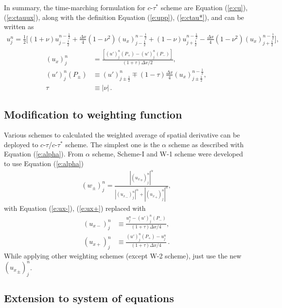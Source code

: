 \documentclass[11pt,dvips]{article}
\numberwithin{equation}{section}
\begin{document}
In summary, the time-marching formulation for $c$-$\tau^*$ scheme are Equation
(\ref{e:cu}), (\ref{e:ctauux}), along with the definition Equation
(\ref{e:upp}), (\ref{e:ctau*}), and can be written as
\begin{align*}
  u_j^n = \frac{1}{2}\Big[
      (1+\nu)u_{j-\frac{1}{2}}^{n-\frac{1}{2}}
    + \frac{\Delta x}{4}(1-\nu^2)(u_x)_{j-\frac{1}{2}}^{n-\frac{1}{2}}
    + (1-\nu)u_{j+\frac{1}{2}}^{n-\frac{1}{2}}
    - \frac{\Delta x}{4}(1-\nu^2)(u_x)_{j+\frac{1}{2}}^{n-\frac{1}{2}}
  \Big],
\end{align*}
\begin{align*}
  (u_x)_j^n &=
    \frac{\left[(u')_j^n(P_+) - (u')_j^n(P_-)\right]}
         {(1+\tau)\Delta x/2}, \\
  (u')_j^n(P_{\pm}) &\equiv
        (u')_{j\pm\frac{1}{2}}^n
    \mp (1-\tau)\frac{\Delta x}{4}
        (u_x)_{j\pm\frac{1}{2}}^{n-\frac{1}{2}}, \\
  \tau &\equiv |\nu|\,.
\end{align*}

\subsection{Modification to weighting function}

Various schemes to calculated the weighted average of spatial derivative can be
deployed to $c$-$\tau$/$c$-$\tau^*$ scheme.  The simplest one is the $\alpha$
scheme as described with Equation (\ref{e:alpha}).  From $\alpha$ scheme,
Scheme-I \citep{chang_courant_2002} and W-1
scheme \citep{chang_multi-dimensional_2003} were developed to use Equation
(\ref{e:alpha})
\begin{align*}
  (w_{\pm})_j^n =
    \frac{|({u_x}_{\mp})_j^n|^{\alpha}}
         {|({u_x}_-)_j^n|^{\alpha}+|({u_x}_+)_j^n|^{\alpha}},
\end{align*}
with Equation (\ref{e:ux-}), (\ref{e:ux+}) replaced with
\begin{align}
  (u_{x-})_j^n &\equiv
    \frac{u_j^n - (u')_j^n(P_-)}{(1+\tau)\Delta x/4}, \label{e:uxp-} \\
  (u_{x+})_j^n &\equiv
    \frac{(u')_j^n(P_+) - u_j^n}{(1+\tau)\Delta x/4}\,. \label{e:uxp+}
\end{align}
While applying other weighting schemes (except W-2 scheme), just use the new
$({u_{x}}_{\pm})_j^n$.

\subsection{Extension to system of equations}
\end{document}
